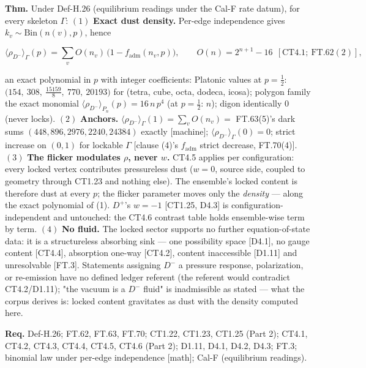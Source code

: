 \begin{theorem}\label{tag:FT-71}
\textbf{Thm.} Under Def-H.26 (equilibrium readings under the Cal-F rate datum), for every skeleton $\Gamma$: $(1)$ \textbf{Exact dust density.} Per-edge independence gives $k_v\sim\mathrm{Bin}(n(v),p)$, hence

\[
\langle\rho_{D^-}\rangle_\Gamma(p)=\sum_v O(n_v)\,\bigl(1-f_{\mathrm{adm}}(n_v,p)\bigr),\qquad O(n)=2^{n+1}-16\ \ [\mathrm{CT4.1};\ \mathrm{FT.62}(2)],
\]

an exact polynomial in $p$ with integer coefficients: Platonic values at $p=\tfrac12$: $\bigl(154,\ 308,\ \tfrac{15159}{8},\ 770,\ 20193\bigr)$ for (tetra, cube, octa, dodeca, icosa); polygon family the exact monomial $\langle\rho_{D^-}\rangle_{P_n}(p)=16\,n\,p^4$ (at $p{=}\tfrac12$: $n$); digon identically $0$ (never locks). $(2)$ \textbf{Anchors.} $\langle\rho_{D^-}\rangle_\Gamma(1)=\sum_vO(n_v)=$ FT.63(5)'s dark sums $(448, 896, 2976, 2240, 24384)$ exactly [machine]; $\langle\rho_{D^-}\rangle_\Gamma(0)=0$; strict increase on $(0,1)$ for lockable $\Gamma$ [clause (4)'s $f_{\mathrm{adm}}$ strict decrease, FT.70(4)]. $(3)$ \textbf{The flicker modulates $\rho$, never $w$.} CT4.5 applies per configuration: every locked vertex contributes pressureless dust ($w=0$, source side, coupled to geometry through CT1.23 and nothing else). The ensemble's locked content is therefore dust at every $p$; the flicker parameter moves only the \textit{density} — along the exact polynomial of (1). $D^+$'s $w=-1$ [CT1.25, D4.3] is configuration-independent and untouched: the CT4.6 contrast table holds ensemble-wise term by term. $(4)$ \textbf{No fluid.} The locked sector supports no further equation-of-state data: it is a structureless absorbing sink — one possibility space [D4.1], no gauge content [CT4.4], absorption one-way [CT4.2], content inaccessible [D1.11] and unresolvable [FT.3]. Statements assigning $D^-$ a pressure response, polarization, or re-emission have no defined ledger referent (the referent would contradict CT4.2/D1.11); "the vacuum is a $D^-$ fluid" is inadmissible as stated — what the corpus derives is: locked content gravitates as dust with the density computed here.

\textbf{Req.} Def-H.26; FT.62, FT.63, FT.70; CT1.22, CT1.23, CT1.25 (Part 2); CT4.1, CT4.2, CT4.3, CT4.4, CT4.5, CT4.6 (Part 2); D1.11, D4.1, D4.2, D4.3; FT.3; binomial law under per-edge independence [math]; Cal-F (equilibrium readings).


\end{theorem}
